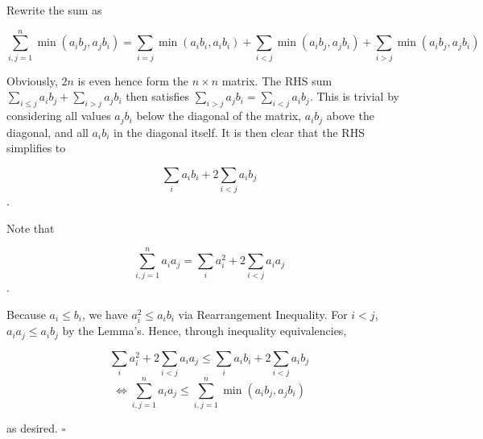\begin{enumerate}
 Rewrite the sum as 

 
 \[\sum_{i,j=1}^{n}\min(a_i b_j,a_jb_i)=\sum_{i=j}\min(a_i b_i,a_i b_i)+\sum_{i<j}\min(a_i b_j,a_jb_i)+\sum_{i>j}\min(a_i b_j,a_jb_i)\]

 Obviously, $2n$ is even hence form the $n \times n$ matrix. The RHS sum $\sum_{i\le j}a_i b_j+\sum_{i>j}a_jb_i$ then satisfies $\sum_{i>j}a_jb_i=\sum_{i<j}a_i b_j$. This is trivial by considering all values $a_jb_i$ below the diagonal of the matrix, $a_ib_j$ above the diagonal, and all $a_ib_i$ in the diagonal itself. It is then clear that the RHS simplifies to 

 
 \[\sum_i a_i b_i+2\sum_{i<j}a_i b_j\].

 Note that 

 
 \[\sum_{i,j=1}^n a_i a_j=\sum_i a_i^2+2\sum_{i<j}a_i a_j\].

 Because $a_i \leq b_i$, we have $a_i^2 \leq a_ib_i$ via Rearrangement Inequality. For $i < j$, $a_ia_j \leq a_ib_j$ by the Lemma's. Hence, through inequality equivalencies,

 
 \[\sum_i a_i^2+2\sum_{i<j}a_i a_j\le \sum_i a_i b_i+2\sum_{i<j}a_i b_j\]
 \[\iff  \sum_{i,j=1}^n a_i a_j \le \sum_{i,j=1}^n\min(a_i b_j,a_jb_i)\]

 as desired. $\square$



\end{enumerate}